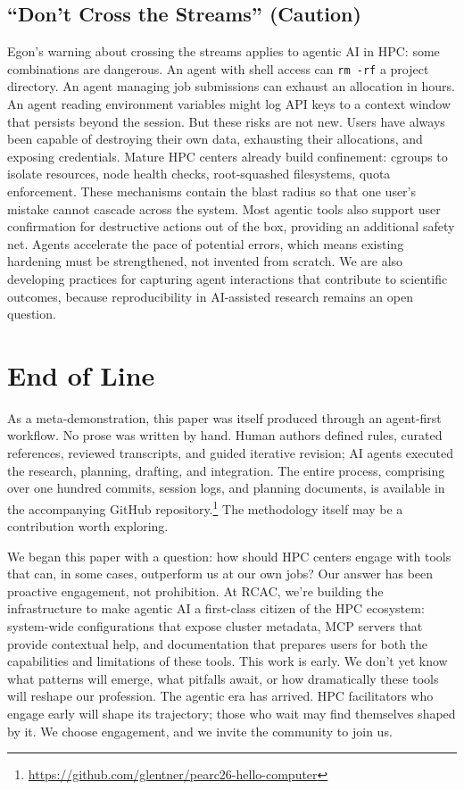 \documentclass[sigconf]{acmart}
\begin{document}
\subsection{``Don't Cross the Streams'' (Caution)}

Egon's warning about crossing the streams applies to agentic AI in HPC: some combinations
are dangerous. An agent with shell access can \texttt{rm -rf} a project directory. An
agent managing job submissions can exhaust an allocation in hours. An agent reading
environment variables might log API keys to a context window that persists beyond the
session.
But these risks are not new. Users have always been capable of destroying their own data,
exhausting their allocations, and exposing credentials. Mature HPC centers already build
confinement: cgroups to isolate resources, node health checks, root-squashed filesystems,
quota enforcement. These mechanisms contain the blast radius so that one user's mistake
cannot cascade across the system. Most agentic tools also support user confirmation for
destructive actions out of the box, providing an additional safety net. Agents accelerate
the pace of potential errors, which
means existing hardening must be strengthened, not invented from scratch. We are also
developing practices for capturing agent interactions that contribute to scientific
outcomes, because reproducibility in AI-assisted research remains an open question.

\section{End of Line}

As a meta-demonstration, this paper was itself produced through an agent-first workflow.
No prose was written by hand. Human authors defined rules, curated references, reviewed
transcripts, and guided iterative revision; AI agents executed the research, planning,
drafting, and integration. The entire process, comprising over one hundred commits, session
logs, and planning documents, is available in the accompanying GitHub
repository.\footnote{\url{https://github.com/glentner/pearc26-hello-computer}} The
methodology itself may be a contribution worth exploring.

We began this paper with a question: how should HPC centers engage with tools that can, in
some cases, outperform us at our own jobs? Our answer has been proactive engagement, not
prohibition.
At RCAC, we're building the infrastructure to make agentic AI a first-class citizen of the
HPC ecosystem: system-wide configurations that expose cluster metadata, MCP servers that
provide contextual help, and documentation that prepares users for both the capabilities
and limitations of these tools.
This work is early. We don't yet know what patterns will
emerge, what pitfalls await, or how dramatically these tools will reshape our profession.
The agentic era has arrived. HPC facilitators who engage early will shape its trajectory;
those who wait may find themselves shaped by it. We choose engagement, and we invite the
community to join us.
\end{document}
